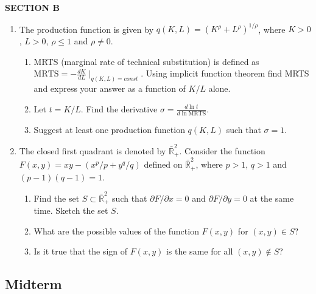 \documentclass[12pt]{article} %
\theoremstyle{definition} %
\begin{document}
\textbf{SECTION B}

\begin{enumerate}[resume]


	\item The production function is given by $q(K, L) = (K^{\rho} + L^{\rho})^{1/\rho}$, where $K>0$, $L>0$, $\rho \leq 1$ and $\rho \neq 0$.
	\begin{enumerate}
		\item MRTS (marginal rate of technical substitution) is defined as $\text{MRTS} = - \frac{dK}{dL}\mid_{q(K,L)=const}$. Using implicit function theorem find MRTS and express your answer as a function of $K/L$ alone.
		\item Let $t=K/L$. Find the derivative $\sigma = \frac{d\ln t}{d\ln \text{MRTS}}$.
		\item Suggest at least one production function $q(K,L)$ such that $\sigma = 1$.
	\end{enumerate}
\item The closed first quadrant is denoted by $\bar{\mathbb{R}}^2_+$. Consider the function $F(x, y)= xy - (x^p /p + y^q/q)$ defined on $\bar{\mathbb{R}}^2_+$, where $p>1$, $q>1$ and $(p-1)(q-1)=1$.
	\begin{enumerate}
	\item Find the set $S\subset \bar{\mathbb{R}}^2_+$ such that $\partial F/\partial x=0$ and $\partial F/\partial y =0$ at the same time. Sketch the set $S$.
	\item What are the possible values of the function $F(x,y)$ for $(x,y)\in S$?
	\item Is it true that the sign of $F(x,y)$ is the same for all $(x,y)\notin S$?
	\end{enumerate}
\end{enumerate}


\subsection{Midterm}
\end{document}
